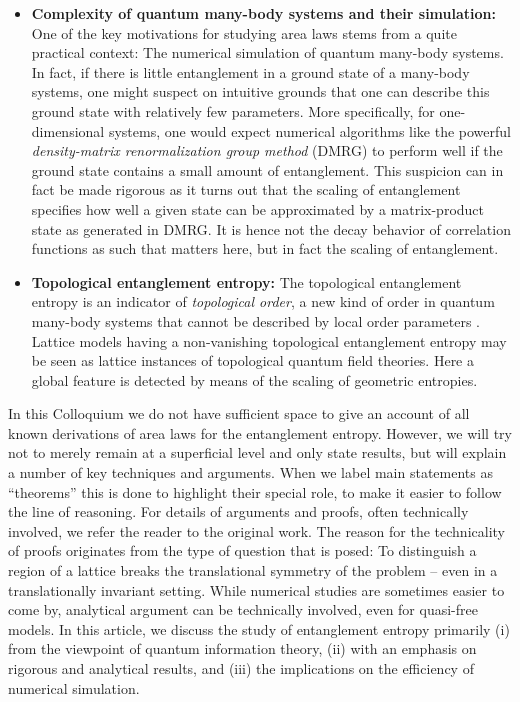 \documentclass[12pt, rmp,floatfix,epsfig,graphics]{revtex4} %
\begin{document}
\begin{itemize}
\item {\bf Complexity of quantum many-body systems and their 
simulation:} One of the key motivations for 
studying area laws stems from a quite practical context: The 
numerical simulation of quantum many-body systems. In fact, if 
there is little entanglement in a ground state of a many-body
systems, one might suspect on intuitive grounds that one can 
describe this ground state with relatively few parameters. More 
specifically, for one-dimensional systems, 
one would expect numerical algorithms like the powerful 
{\it density-matrix renormalization group method} \cite{White,Scholl} 
(DMRG) to perform well if the ground state contains a small 
amount of entanglement. This suspicion can in fact be made 
rigorous \cite{Peschel,DMRG,OneD,SchuchApprox} as it turns out 
that the scaling of entanglement specifies how well a given state 
can be approximated by a matrix-product state \cite{FCS,Scholl} 
as generated in DMRG. It is hence not the decay behavior of 
correlation functions as such that matters here, but in fact 
the scaling of entanglement.

\item {\bf Topological entanglement entropy:} 
The topological entanglement entropy is an indicator of 
{\it topological order},\cite{OldWen,WittenOld,Ortiz} 
a new kind of order in quantum 
many-body systems that cannot be described by local order 
parameters \cite{Preskill,Wen,FradkinTopological,Haque,Ortiz}. 
Lattice models having a non-vanishing topological entanglement 
entropy may be seen as lattice instances of topological 
quantum field theories. Here a global feature is detected by means
of the scaling of geometric entropies.
\end{itemize}

In this Colloquium we do not have sufficient space to give 
an account of all known derivations of area laws for the 
entanglement entropy. However, we will try 
not to merely remain at a superficial level and only state results, 
but will explain 
a number of key techniques and arguments. When we label main 
statements as ``theorems'' this is done to highlight their 
special role, to make it easier to follow the line of reasoning.
For details of arguments 
and proofs, often technically involved, we refer the reader to the 
original work. The reason for the technicality of proofs originates 
from the type of question that is posed: To distinguish a region 
of a lattice breaks the translational symmetry of the problem -- even in a translationally invariant setting.
While numerical studies are sometimes easier to come by, analytical 
argument can be technically involved, even for quasi-free 
models. In this article, we discuss the study of entanglement 
entropy primarily (i) from the viewpoint of quantum information 
theory, (ii) with an emphasis on rigorous and analytical results, 
and (iii) the implications on the efficiency of numerical
simulation.
\end{document}
